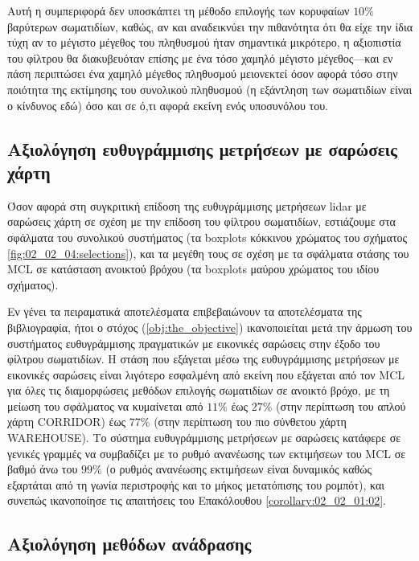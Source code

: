 Αυτή η συμπεριφορά δεν υποσκάπτει τη μέθοδο επιλογής των κορυφαίων $10\%$
βαρύτερων σωματιδίων, καθώς, αν και αναδεικνύει την πιθανότητα ότι θα είχε την
ίδια τύχη αν το μέγιστο μέγεθος του πληθυσμού ήταν σημαντικά μικρότερο, η
αξιοπιστία του φίλτρου θα διακυβευόταν επίσης με ένα τόσο χαμηλό μέγιστο
μέγεθος---και εν πάση περιπτώσει ένα χαμηλό μέγεθος πληθυσμού μειονεκτεί όσον
αφορά τόσο στην ποιότητα της εκτίμησης του συνολικού πληθυσμού (η εξάντληση των
σωματιδίων είναι ο κίνδυνος εδώ) όσο και σε ό,τι αφορά εκείνη ενός υποσυνόλου
του.


\subsection{Αξιολόγηση ευθυγράμμισης μετρήσεων με σαρώσεις χάρτη}
\label{subsection:02_02_04:04}

Όσον αφορά στη συγκριτική επίδοση της ευθυγράμμισης μετρήσεων lidar με σαρώσεις
χάρτη σε σχέση με την επίδοση του φίλτρου σωματιδίων, εστιάζουμε στα σφάλματα
του συνολικού συστήματος (τα boxplots κόκκινου χρώματος του σχήματος
\ref{fig:02_02_04:selections}), και τα μεγέθη τους σε σχέση με τα σφάλματα
στάσης του MCL σε κατάσταση ανοικτού βρόχου (τα boxplots μαύρου χρώματος του
ιδίου σχήματος).

Εν γένει τα πειραματικά αποτελέσματα επιβεβαιώνουν τα αποτελέσματα της
βιβλιογραφία, ήτοι ο στόχος (\ref{obj:the_objective}) ικανοποιείται μετά την
άρμωση του συστήματος ευθυγράμμισης πραγματικών με εικονικές σαρώσεις στην
έξοδο του φίλτρου σωματιδίων. Η στάση που εξάγεται μέσω της ευθυγράμμισης
μετρήσεων με εικονικές σαρώσεις είναι λιγότερο εσφαλμένη από εκείνη που
εξάγεται από τον MCL για όλες τις διαμορφώσεις μεθόδων επιλογής σωματιδίων σε
ανοικτό βρόχο, με τη μείωση του σφάλματος να κυμαίνεται από $11\%$ έως $27\%$
(στην περίπτωση του απλού χάρτη CORRIDOR) έως $77\%$ (στην περίπτωση του πιο
σύνθετου χάρτη WAREHOUSE). Το σύστημα ευθυγράμμισης μετρήσεων με σαρώσεις
κατάφερε σε γενικές γραμμές να συμβαδίζει με το ρυθμό ανανέωσης των εκτιμήσεων
του MCL σε βαθμό άνω του $99\%$ (ο ρυθμός ανανέωσης εκτιμήσεων είναι δυναμικός
καθώς εξαρτάται από τη γωνία περιστροφής και το μήκος μετατόπισης του ρομπότ),
και συνεπώς ικανοποίησε τις απαιτήσεις του Επακόλουθου
\ref{corollary:02_02_01:02}.

\subsection{Αξιολόγηση μεθόδων ανάδρασης}
\label{subsection:02_02_04:05}

